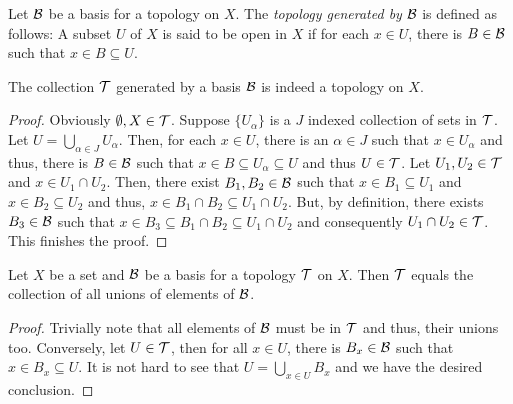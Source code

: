 \begin{definition}
    Let $\mathcal{B}$ be a basis for a topology on $X$. The \textit{topology generated by} $\mathcal{B}$ is defined as follows: A subset $U$ of $X$ is said to be open in $X$ if for each $x\in U$, there is $B\in\mathcal{B}$ such that $x\in B\subseteq U$.
\end{definition}

\begin{proposition}
    The collection $\mathcal{T}$ generated by a basis $\mathcal{B}$ is indeed a topology on $X$.
\end{proposition}
\begin{proof}
    Obviously $\emptyset, X\in\mathcal{T}$. Suppose $\{U_\alpha\}$ is a $J$ indexed collection of sets in $\mathcal{T}$. Let $U = \bigcup_{\alpha\in J}U_\alpha$. Then, for each $x\in U$, there is an $\alpha\in J$ such that $x\in U_\alpha$ and thus, there is $B\in\mathcal{B}$ such that $x\in B\subseteq U_\alpha\subseteq U$ and thus $U\in\mathcal{T}$. Let $U_1,U_2\in\mathcal{T}$ and $x\in U_1\cap U_2$. Then, there exist $B_1,B_2\in\mathcal{B}$ such that $x\in B_1\subseteq U_1$ and $x\in B_2\subseteq U_2$ and thus, $x\in B_1\cap B_2\subseteq U_1\cap U_2$. But, by definition, there exists $B_3\in\mathcal{B}$ such that $x\in B_3\subseteq B_1\cap B_2\subseteq U_1\cap U_2$ and consequently $U_1\cap U_2\in\mathcal{T}$. This finishes the proof.
\end{proof}

\begin{lemma}
    Let $X$ be a set and $\mathcal{B}$ be a basis for a topology $\mathcal{T}$ on $X$. Then $\mathcal{T}$ equals the collection of all unions of elements of $\mathcal{B}$.
\end{lemma}
\begin{proof}
    Trivially note that all elements of $\mathcal{B}$ must be in $\mathcal{T}$ and thus, their unions too. Conversely, let $U\in\mathcal{T}$, then for all $x\in U$, there is $B_x\in\mathcal{B}$ such that $x\in B_x\subseteq U$. It is not hard to see that $U = \bigcup_{x\in U}B_x$ and we have the desired conclusion.
\end{proof}

